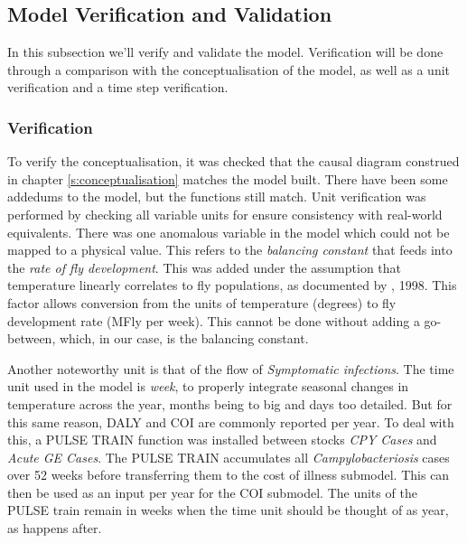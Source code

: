 \subsection{Model Verification and Validation}
In this subsection we'll verify and validate the model. Verification will be done through a comparison with the conceptualisation of the model, as well as a unit verification and a time step verification. 

\subsubsection{Verification}

    
To verify the conceptualisation, it was checked that the causal diagram construed in chapter \ref{s:conceptualisation} matches the model built. There have been some addedums to the model, but the functions still match.  
Unit verification was performed by checking all variable units for ensure consistency with real-world equivalents. There was one anomalous variable in the model which could not be mapped to a physical value. This refers to the \textit{balancing constant} that feeds into the \textit{rate of fly development}. This was added under the assumption that temperature linearly correlates to fly populations, as documented by \citeauthor{blanckenhorn_adaptive_1998}, 1998. This factor allows conversion from the units of temperature (degrees) to fly development rate (MFly per week). This cannot be done without adding a go-between, which, in our case, is the balancing constant. 

Another noteworthy unit is that of the flow of \textit{Symptomatic infections}. The time unit used in the model is \textit{week}, to properly integrate seasonal changes in temperature across the year, months being to big and days too detailed. But for this same reason, DALY and COI are commonly reported per year. To deal with this, a PULSE TRAIN function was installed between stocks \textit{CPY Cases} and \textit{Acute GE Cases}. The PULSE TRAIN accumulates all \textit{Campylobacteriosis} cases over 52 weeks before transferring them to the cost of illness submodel. This can then be used as an input per year for the COI submodel. The units of the PULSE train remain in weeks when the time unit should be thought of as year, as happens after. 
    
